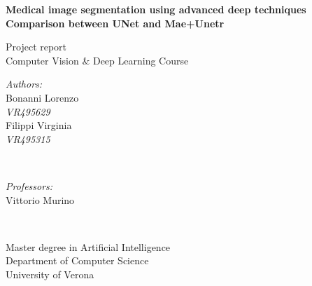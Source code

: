 \documentclass[11pt]{article}
\begin{document}
\begin{titlepage}
    \begin{center}
        \vspace*{1cm}
        \huge
        \textbf{Medical image segmentation using advanced deep techniques}\\
        \vspace{0.5cm}
        \Large
        \textbf{Comparison between UNet and Mae+Unetr}
        \vspace{0.5cm}
        
            
        \vspace{0.5cm}
        \large
        Project report\\
        Computer Vision \& Deep Learning Course
            
        \vspace{3.5cm}
        \begin{minipage}{0.4\textwidth}
        \begin{flushleft} \large
        \emph{Authors:}\\
        \vspace{5mm}
        Bonanni Lorenzo\\ \textit{VR495629} \\
        \vspace{5mm}
        Filippi Virginia\\ \textit{VR495315}
        \end{flushleft}
        \end{minipage}
        ~
        \begin{minipage}{0.4\textwidth}
        \begin{flushright} \large
        \emph{Professors:}\\
        \vspace{5mm}
        Vittorio Murino
        \end{flushright}
        \end{minipage}\\[2cm]
            
        \vfill
        \vspace{0.8cm}
            
        \large
        Master degree in Artificial Intelligence\\
        Department of Computer Science\\
        University of Verona\\
            
    \end{center}
\end{titlepage}


\newpage
\tableofcontents





\newpage
\printbibliography[heading=bibintoc,title={Bibliography}]
\end{document}
